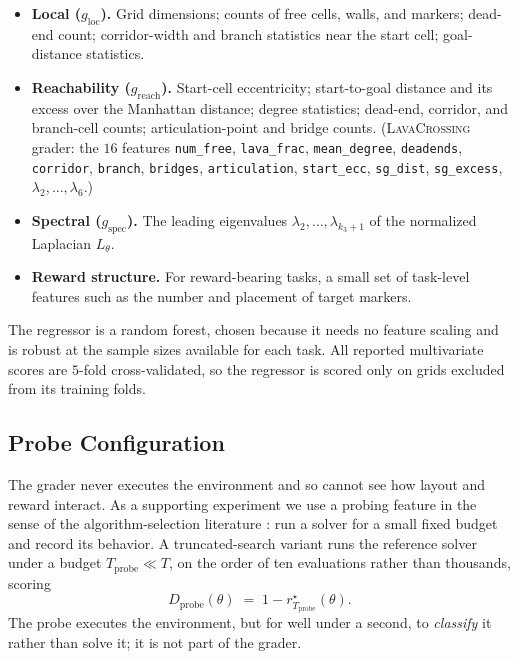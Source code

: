 \documentclass[twoside]{article}
\begin{document}
\begin{itemize}[leftmargin=*, itemsep=1pt]
\item \textbf{Local ($g_{\mathrm{loc}}$).} Grid dimensions; counts of free cells, walls, and markers; dead-end count; corridor-width and branch statistics near the start cell; goal-distance statistics.
\item \textbf{Reachability ($g_{\mathrm{reach}}$).} Start-cell eccentricity; start-to-goal distance and its excess over the Manhattan distance; degree statistics; dead-end, corridor, and branch-cell counts; articulation-point and bridge counts. (\textsc{LavaCrossing} grader: the $16$ features \texttt{num\_free}, \texttt{lava\_frac}, \texttt{mean\_degree}, \texttt{deadends}, \texttt{corridor}, \texttt{branch}, \texttt{bridges}, \texttt{articulation}, \texttt{start\_ecc}, \texttt{sg\_dist}, \texttt{sg\_excess}, $\lambda_2,\ldots,\lambda_6$.)
\item \textbf{Spectral ($g_{\mathrm{spec}}$).} The leading eigenvalues $\lambda_2, \ldots, \lambda_{k_3+1}$ of the normalized Laplacian $L_\theta$.
\item \textbf{Reward structure.} For reward-bearing tasks, a small set of task-level features such as the number and placement of target markers.
\end{itemize}

The regressor is a random forest, chosen because it needs no feature scaling and is robust at the sample sizes available for each task. All reported multivariate scores are $5$-fold cross-validated, so the regressor is scored only on grids excluded from its training folds.

\subsection{Probe Configuration}
\label{sec:mini-hc}
The grader never executes the environment and so cannot see how layout and reward interact. As a supporting experiment we use a probing feature in the sense of the algorithm-selection literature \citep{xu2008satzilla, hutter2014algorithm}: run a solver for a small fixed budget and record its behavior. A truncated-search variant runs the reference solver under a budget $T_{\mathrm{probe}} \ll T$, on the order of ten evaluations rather than thousands, scoring
\begin{equation}
    D_{\mathrm{probe}}(\theta) \;=\; 1 - r^\star_{T_{\mathrm{probe}}}(\theta).
    \label{eq:mini-hc}
\end{equation}
The probe executes the environment, but for well under a second, to \emph{classify} it rather than solve it; it is not part of the grader.
\end{document}

